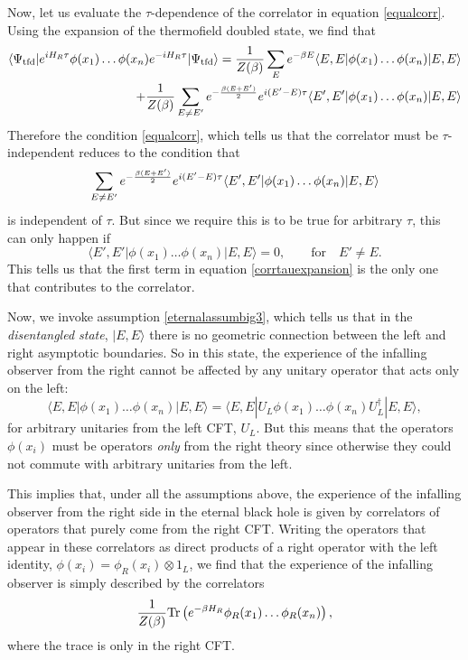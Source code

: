 \documentclass[12pt]{article}
\newcommand{\tfd}{\Psi_{\text{tfd}}} %
\def\tr{{\rm Tr}}
\newcommand{\be}{\begin{equation}}
\newcommand{\ee}{\end{equation}}
\begin{document}
Now, let us evaluate the $\tau$-dependence of the correlator in
equation \eqref{equalcorr}. Using the expansion of the thermofield doubled
state, we find that
\be
\label{corrtauexpansion}
\begin{split}
\langle \tfd | e^{i H_R \tau} \phi(x_1) \ldots \phi(x_n) e^{-i H_R \tau} |\tfd \rangle = {1 \over Z(\beta)} \sum_{E} e^{-\beta E} \langle E, E | \phi(x_1) \ldots \phi(x_n) | E, E \rangle& \\ + {1 \over Z(\beta)} \sum_{E \neq E'} e^{-{\beta(E+ E') \over 2}}  e^{i (E' - E) \tau} \langle E', E'| \phi(x_1) \ldots \phi(x_n) |E, E \rangle&
\end{split}
\ee
Therefore the condition \eqref{equalcorr}, which tells us that the correlator must be $\tau$-independent reduces to the condition that
\[
\sum_{E \neq E'} e^{-{\beta(E+ E') \over 2}}  e^{i (E' - E) \tau} \langle E', E'| \phi(x_1) \ldots \phi(x_n) |E, E \rangle
\]
is independent of $\tau$. But since we require this is to be true for arbitrary $\tau$, this can only happen if
\be
\langle E', E'| \phi(x_1) \ldots \phi(x_n) |E, E \rangle = 0, \qquad \text{for} \quad  E' \neq E.
\ee
This tells us that the first term in equation \eqref{corrtauexpansion} is the only one that contributes to the correlator.

Now, we invoke assumption \ref{eternalassumbig3}, which tells us that in the {\em disentangled state}, $| E, E \rangle$ there is no geometric connection between the left and right asymptotic boundaries. So in this state, the experience of the infalling observer from the right cannot be affected by any unitary operator that acts only on the left:
\be
\langle E, E | \phi(x_1) \ldots \phi(x_n) | E, E \rangle = \langle E, E | U_L \phi(x_1) \ldots \phi(x_n) U_L^{\dagger}| E, E \rangle,
\ee
for arbitrary unitaries from the left CFT, $U_L$. But this means that the operators $\phi(x_i)$ must be operators {\em only} from the right theory since otherwise they could not commute with arbitrary unitaries from the left.

This implies that, under all the assumptions above, the experience of the infalling observer from the right side in the eternal black hole is given by correlators of operators that purely come from the right CFT. Writing the operators that appear in these correlators as direct products of a right operator with the left identity, $\phi(x_i) = \phi_R(x_i) \otimes 1_L$, we find that the experience of the infalling observer is simply described by the correlators
\be
{1 \over Z(\beta)} \tr\left(e^{-\beta H_R} \phi_R(x_1) \ldots \phi_R(x_n) \right),
\ee
where the trace is only in the right CFT.
\end{document}
